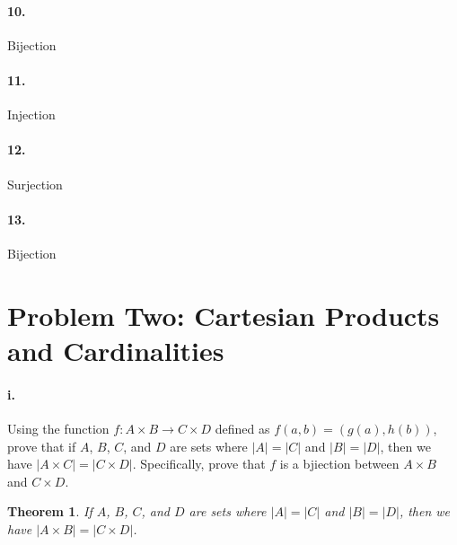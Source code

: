 \documentclass[10pt,letter]{article}
\newtheorem*{thm}{Theorem}
\begin{document}
\paragraph{10.} Bijection
\paragraph{11.} Injection
\paragraph{12.} Surjection
\paragraph{13.} Bijection

\section*{Problem Two: Cartesian Products and Cardinalities}

\paragraph{i.} Using the function $f: A \times B \rightarrow C \times D$ defined as $f(a, b) = (g(a), h(b))$, prove that if $A$, $B$, $C$, and $D$ are sets where $|A| = |C|$ and $|B| = |D|$, then we have $|A \times C| = |C \times D|$. Specifically, prove that $f$ is a bjiection between $A \times B$ and $C \times D$. 

\begin{thm} If $A$, $B$, $C$, and $D$ are sets where $|A| = |C|$ and $|B| = |D|$, then we have $|A \times B| = |C \times D|$. 
\end{thm}
\end{document}
